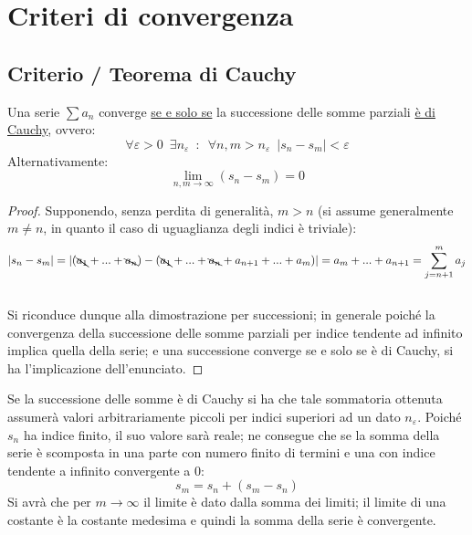 \documentclass[10pt, oneside]{book}
\theoremstyle{plain}
\begin{document}
\section{Criteri di convergenza}
\subsection{Criterio / Teorema di Cauchy}
\begin{ther}
Una serie $\sum a_n$ converge \underline{se e solo se} la successione delle somme parziali \underline{è di Cauchy}, ovvero:
\[\forall \varepsilon > 0 \enspace \exists n_\varepsilon \enspace : \enspace \forall n, m >  n_\varepsilon \enspace |s_n - s_m| < \varepsilon\]
Alternativamente:
\[\lim \limits_{n,m \rightarrow \infty} (s_n - s_m) = 0\]
\end{ther}
\begin{proof}
Supponendo, senza perdita di generalità, $m > n$ (si assume generalmente $m \neq n$, in quanto il caso di uguaglianza degli indici è triviale):
\[|s_n - s_m| = |(\bcancel{a_1} + ... + \bcancel{a_n}) - (\bcancel{a_1} + ... + \bcancel{a_n} + a_{n+1} + ... + a_m)| = a_m + ... + a_{n + 1} = \sum \limits_{j = n + 1}^{m} a_j\]
\\Si riconduce dunque alla dimostrazione per successioni; in generale poiché la convergenza della successione delle somme parziali per indice tendente ad infinito implica quella della serie; e una successione converge se e solo se è di Cauchy, si ha l'implicazione dell'enunciato.
\end{proof}
\begin{oss}
Se la successione delle somme è di Cauchy si ha che tale sommatoria ottenuta assumerà valori arbitrariamente piccoli per indici superiori ad un dato $n_\varepsilon$. Poiché $s_n$ ha indice finito, il suo valore sarà reale; ne consegue che se la somma della serie è scomposta in una parte con numero finito di termini e una con indice tendente a infinito convergente a 0:
\[s_m = s_n + (s_m - s_n)\]
Si avrà che per $m \rightarrow \infty$ il limite è dato dalla somma dei limiti; il limite di una costante è la costante medesima e quindi la somma della serie è convergente.
\end{oss}
\end{document}
